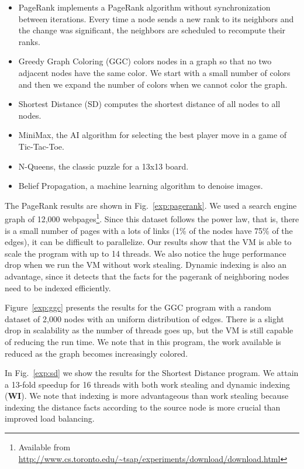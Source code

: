 \begin{itemize}
\item PageRank implements a PageRank algorithm without synchronization
  between iterations. Every time a node sends a new rank to its
  neighbors and the change was significant, the neighbors are
  scheduled to recompute their ranks.
\item Greedy Graph Coloring (GGC) colors nodes in a graph so that no
  two adjacent nodes have the same color. We start with a small number
  of colors and then we expand the number of colors when we cannot
  color the graph.
\item Shortest Distance (SD) computes the shortest distance of all
  nodes to all nodes.
\item MiniMax, the AI algorithm for selecting the best player move in a game of Tic-Tac-Toe.
\item N-Queens, the classic puzzle for a 13x13 board.
\item Belief Propagation, a machine learning algorithm to denoise
  images.
\end{itemize}

The PageRank results are shown in Fig.~\ref{exp:pagerank}. We used a
search engine graph of 12,000 webpages\footnote{Available from
  \url{http://www.cs.toronto.edu/~tsap/experiments/download/download.html}}. Since
this dataset follows the power law, that is, there is a small number
of pages with a lots of links (1\% of the nodes have 75\% of the
edges), it can be difficult to parallelize. Our results show that the
VM is able to scale the program with up to 14 threads.  We also notice
the huge performance drop when we run the VM without work
stealing. Dynamic indexing is also an advantage, since it detects that
the facts for the pagerank of neighboring nodes need to be indexed
efficiently.

Figure~\ref{exp:ggc} presents the results for the GGC program with a
random dataset of 2,000 nodes with an uniform distribution of edges.
There is a slight drop in scalability as the number of threads goes
up, but the VM is still capable of reducing the run time. We note that
in this program, the work available is reduced as the graph becomes
increasingly colored.

In Fig.~\ref{exp:sd} we show the results for the Shortest Distance program.
We attain a 13-fold speedup for 16 threads with both work stealing and dynamic
indexing (\textbf{WI}). We note that indexing is more advantageous than work stealing
because indexing the distance facts according to the source node is more crucial
than improved load balancing.

